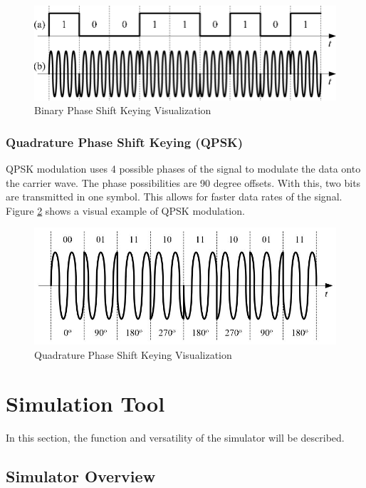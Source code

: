 \documentclass[12pt]{report}
\begin{document}
\begin{figure}[h]
    \centering
    \includegraphics[width=4.5in]{Example-of-BPSK-modulation-format-a-binary-signal-and-b-BPSK-modulated-signal.png}
    \caption{Binary Phase Shift Keying Visualization \cite{mahdirajiAdvancedModulationFormats2010} }
    \label{fig:BPSKsig}
\end{figure}

\subsection{Quadrature Phase Shift Keying (QPSK)}
\label{sec:QPSK}

QPSK modulation uses 4 possible phases of the signal to modulate the data onto the carrier wave. The phase possibilities are 90 degree offsets. With this, two bits are transmitted in one symbol. This allows for faster data rates of the signal. Figure \ref{fig:QPSKmod} shows a visual example of QPSK modulation.

\begin{figure}[h]
    \centering
    \includegraphics[width=4.5in]{QPSK_sig.JPG}
    \caption{Quadrature Phase Shift Keying Visualization \cite{mahdirajiAdvancedModulationFormats2010} }
    \label{fig:QPSKmod}
\end{figure}


\chapter {Simulation Tool}
In this section, the function and versatility of the simulator will be described.

\section{Simulator Overview}
\end{document}
